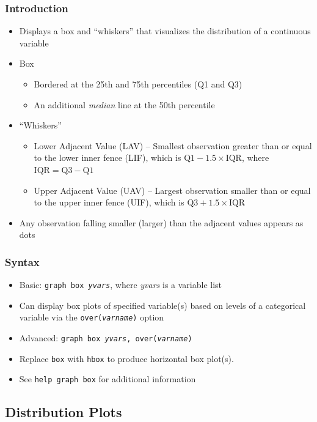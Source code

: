 \documentclass{beamer}
\begin{document}
\begin{frame}
	\frametitle{Introduction}
		\begin{itemize}
			\item Displays a box and ``whiskers'' that visualizes the distribution of a continuous variable
			\item Box
				\begin{itemize}
					\item Bordered at the 25th and 75th percentiles (Q1 and Q3)
					\item An additional \textit{median} line at the 50th percentile
				\end{itemize}
			\item ``Whiskers''
				\begin{itemize}
					\item Lower Adjacent Value (LAV) -- Smallest observation greater than or equal to the lower inner fence (LIF), which is $\mbox{Q1}-1.5\times \mbox{IQR}$, where $\mbox{IQR}=\mbox{Q3}-\mbox{Q1}$
					\item Upper Adjacent Value (UAV) -- Largest observation smaller than or equal to the upper inner fence (UIF), which is $\mbox{Q3}+1.5\times \mbox{IQR}$
				\end{itemize}
			\item Any observation falling smaller (larger) than the adjacent values appears as dots
		\end{itemize}
\end{frame}

\begin{frame}
	\frametitle{Syntax}
		\begin{itemize}
			\item Basic: \texttt{graph box \textit{yvars}}, where \textit{yvars} is a variable list
			\item Can display box plots of specified variable(s) based on levels of a categorical variable via the \texttt{over(\textit{varname})} option
			\item Advanced: \texttt{graph box \textit{yvars}, over(\textit{varname})}
			\item Replace \texttt{box} with \texttt{hbox} to produce horizontal box plot(s).
			\item See \texttt{help graph box} for additional information
		\end{itemize}
\end{frame}

\subsection{Distribution Plots}
\end{document}
